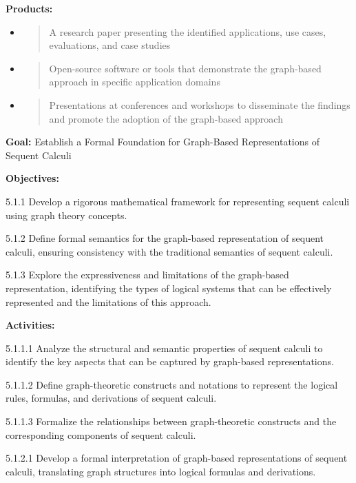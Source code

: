 \textbf{Products:}

\begin{itemize}
\item
  \begin{quote}
  A research paper presenting the identified applications, use cases,
  evaluations, and case studies
  \end{quote}
\item
  \begin{quote}
  Open-source software or tools that demonstrate the graph-based
  approach in specific application domains
  \end{quote}
\item
  \begin{quote}
  Presentations at conferences and workshops to disseminate the findings
  and promote the adoption of the graph-based approach
  \end{quote}
\end{itemize}

\textbf{Goal:} Establish a Formal Foundation for Graph-Based
Representations of Sequent Calculi

\textbf{Objectives:}

5.1.1 Develop a rigorous mathematical framework for representing sequent
calculi using graph theory concepts.

5.1.2 Define formal semantics for the graph-based representation of
sequent calculi, ensuring consistency with the traditional semantics of
sequent calculi.

5.1.3 Explore the expressiveness and limitations of the graph-based
representation, identifying the types of logical systems that can be
effectively represented and the limitations of this approach.

\textbf{Activities:}

5.1.1.1 Analyze the structural and semantic properties of sequent
calculi to identify the key aspects that can be captured by graph-based
representations.

5.1.1.2 Define graph-theoretic constructs and notations to represent the
logical rules, formulas, and derivations of sequent calculi.

5.1.1.3 Formalize the relationships between graph-theoretic constructs
and the corresponding components of sequent calculi.

5.1.2.1 Develop a formal interpretation of graph-based representations
of sequent calculi, translating graph structures into logical formulas
and derivations.

